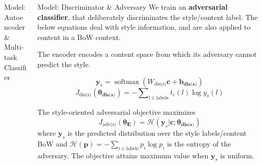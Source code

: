 \documentclass[final]{beamer}
\newlength{\onecolwid}
\newlength{\twocolwid}
\newcommand{\loss}[1]{J_{\text{#1}}}
\newcommand{\nnweight}[1]{\bm{\theta_{\text{#1}}}}
\newcommand{\weight}[1]{W_{\text{#1}}}
\newcommand{\bias}[1]{\bm{b_{\text{#1}}}}
\begin{document}
\begin{frame}[t]
\begin{columns}[t]
\begin{column}{\twocolwid}
\begin{columns}[t,totalwidth=\twocolwid]
\begin{column}{\onecolwid}
\begin{block}{Model: Autoencoder \&\\Multi-task Classifier}
                    \end{block}


                \end{column} %

                \begin{column}{\onecolwid}\vspace{-.6in} %

                    \begin{block}{Model: Discriminator \& Adversary}
                        We train an \textbf{adversarial classifier}, that deliberately discriminates the style/content label. The below equations deal with style information, and are also applied to content in a BoW context.

                        The encoder encodes a content space from which its adversary cannot predict the style.

                        \vspace{-1.6cm}

                        \begin{equation*}
                            \bm y_s                          = \operatorname{softmax}(\weight{dis(s)} \bm c + \bias{dis(s)})
                        \end{equation*}
                        \begin{equation*}
                            \loss{dis(s)}(\nnweight{dis(s)}) = - \sum\nolimits_{l\in\text{labels}} t_c(l)\log y_s(l)
                        \end{equation*}

                        The style-oriented adversarial objective maximizes
                        \begin{equation*}
                            \loss{adv(s)}(\nnweight{E})=\mathcal{H}(\bm y_s|\bm c; \nnweight{dis(s)})
                        \end{equation*}
                        where $\bm y_s$ is the predicted distribution over the style labels/content BoW and $\mathcal{H}(\bm p)=-\sum_{i\in\text{labels}}p_i\log p_i$ is the entropy of the adversary. The objective attains maximum value when $\bm y_s$ is uniform.

                    \end{block}


\end{column}
\end{columns}
\end{column}
\end{columns}
\end{frame}
\end{document}
